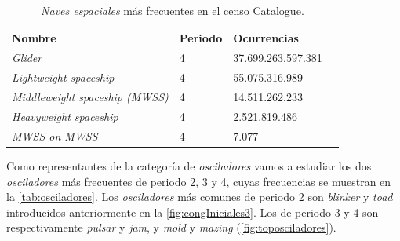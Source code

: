 \documentclass[../proyecto.tex]{memoir}
\begin{document}
\begin{table}[H]
\centering
\begin{tabular}{|l|l|l|l|}
\hline
\textbf{Nombre}                          & \textbf{Periodo} & \textbf{Ocurrencias}    \\ \hline
\textit{Glider}                 & 4       & 37.699.263.597.381 \\ \hline
\textit{Lightweight spaceship}  & 4       & 55.075.316.989     \\ \hline
\textit{Middleweight spaceship (MWSS)} & 4       & 14.511.262.233      \\ \hline
\textit{Heavyweight spaceship}  & 4       & 2.521.819.486      \\ \hline
\textit{MWSS on MWSS}  & 4       & 7.077      \\ \hline
\end{tabular}
\caption{\textit{Naves espaciales} más frecuentes en el censo {Catalogue}.}
\label{tab:sopa1naves}
\end{table}

Como representantes de la categoría de \textit{osciladores} vamos a estudiar los dos \textit{osciladores} más frecuentes de periodo 2, 3 y 4, cuyas frecuencias se muestran en la \autoref{tab:osciladores}. Los \textit{osciladores} más comunes de periodo 2 son \textit{blinker} y \textit{toad} introducidos anteriormente en la \autoref{fig:congIniciales3}. Los de periodo 3 y 4 son respectivamente \textit{pulsar} y \textit{jam}, y  \textit{mold} y \textit{mazing} (\autoref{fig:toposciladores}).
\end{document}

